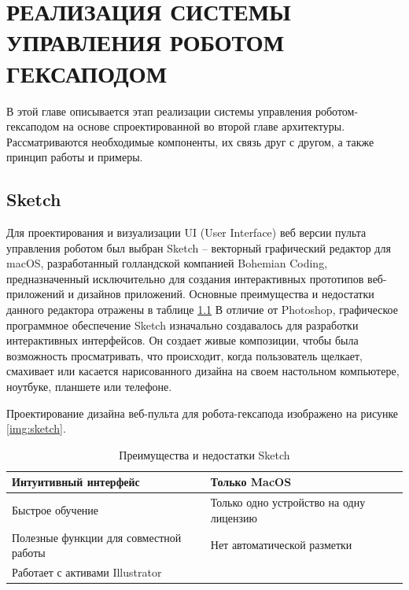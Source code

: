 \chapter{РЕАЛИЗАЦИЯ СИСТЕМЫ УПРАВЛЕНИЯ РОБОТОМ ГЕКСАПОДОМ}
   
В этой главе описывается этап реализации системы управления роботом-гексаподом на основе спроектированной во второй главе архитектуры. Рассматриваются необходимые компоненты, их связь друг с другом, а также  принцип работы и примеры.

\section {Sketch}

Для проектирования и визуализации UI (User Interface) веб версии пульта управления роботом был выбран Sketch – векторный графический редактор для macOS, разработанный голландской компанией Bohemian Coding, предназначенный исключительно для создания интерактивных прототипов веб-приложений и дизайнов приложений. Основные преимущества и недостатки данного редактора отражены в таблице \ref{tab:sketch} В отличие от Photoshop, графическое программное обеспечение Sketch изначально создавалось для разработки интерактивных интерфейсов. Он создает живые композиции, чтобы была возможность просматривать, что происходит, когда пользователь щелкает, смахивает или касается нарисованного дизайна на своем настольном компьютере, ноутбуке, планшете или телефоне.

Проектирование дизайна веб-пульта для робота-гексапода изображено на рисунке \ref{img:sketch}.


\begin{table}[h!]
	\caption{Преимущества и недостатки Sketch}
	\label{tab:sketch}
	\begin{tabularx}{\textwidth}{|X|X|}
		\tabheader{Преимущества}{Недостатки}
		Интуитивный интерфейс & Только MacOS\\\hline
		Быстрое обучение & Только одно устройство на одну лицензию\\\hline
		Полезные функции для совместной работы & Нет автоматической разметки\\\hline
		Работает с активами Illustrator & \\\hline
	\end{tabularx}
\end{table}

